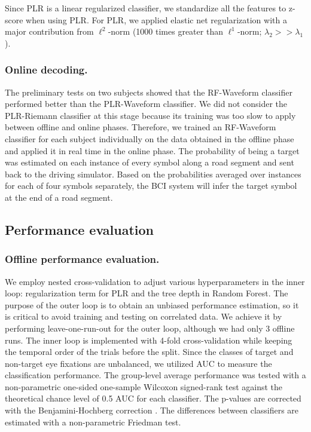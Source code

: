 \documentclass[12pt]{iopart}
\begin{document}
Since PLR is a linear regularized classifier,
we standardize all the features to z-score when
using PLR. For PLR, we applied elastic net regularization
with a major contribution from $\ell^2$-norm (1000 times greater than $\ell^1$-norm; $\lambda_2 >> \lambda_1$).




\subsubsection*{Online decoding.}
The preliminary tests on two subjects showed that the RF-Waveform classifier
performed better than the PLR-Waveform classifier. We did not consider the
PLR-Riemann classifier at this stage because its training
was too slow to apply between offline and online phases.
Therefore, we trained an RF-Waveform classifier  for each subject individually on the data obtained in the offline phase 
and applied it in real time in the online phase.
The probability of being a target was estimated on each instance of every symbol along a road segment and sent back to the driving simulator. Based on the probabilities averaged over instances for each of four symbols separately, the BCI system will infer the target symbol at the end of a road segment.


\subsection{Performance evaluation}

\subsubsection*{Offline performance evaluation.}
We employ nested cross-validation to adjust various hyperparameters in the inner loop:
regularization term for PLR and the tree depth in Random Forest.
The purpose of the outer loop is to obtain an unbiased performance estimation,
so it is critical to avoid training and testing on correlated data.
We achieve it by performing leave-one-run-out for the outer loop,
although we had only 3 offline runs.
The inner loop is implemented with 4-fold cross-validation while keeping
the temporal order of the trials before the split.
Since the classes of target and non-target eye fixations are unbalanced,
we utilized AUC to measure the classification performance.
The group-level average performance was tested with a non-parametric one-sided one-sample Wilcoxon signed-rank test against the theoretical chance level of 0.5 AUC for each classifier.
The p-values are corrected with 
the Benjamini-Hochberg correction \cite{benjamini_controlling_1995}.
The differences between classifiers are estimated with a non-parametric Friedman test.
\end{document}
